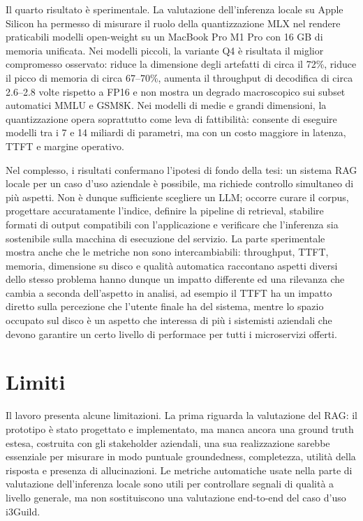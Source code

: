 Il quarto risultato è sperimentale. La valutazione dell'inferenza locale su
Apple Silicon ha permesso di misurare il ruolo della quantizzazione MLX nel
rendere praticabili modelli open-weight su un MacBook Pro M1 Pro con 16 GB di
memoria unificata. Nei modelli piccoli, la variante Q4 è risultata il miglior
compromesso osservato: riduce la dimensione degli artefatti di circa il 72\%,
riduce il picco di memoria di circa 67--70\%, aumenta il throughput di
decodifica di circa 2.6--2.8 volte rispetto a FP16 e non mostra un degrado
macroscopico sui subset automatici MMLU e GSM8K. Nei modelli di medie e grandi dimensioni, la
quantizzazione opera soprattutto come leva di fattibilità: consente di
eseguire modelli tra i 7 e 14 miliardi di parametri, ma con un costo maggiore in latenza,
TTFT e margine operativo.

Nel complesso, i risultati confermano l'ipotesi di fondo della tesi: un sistema
RAG locale per un caso d'uso aziendale è possibile, ma richiede controllo
simultaneo di più aspetti. Non è dunque sufficiente scegliere un LLM; occorre
curare il corpus, progettare accuratamente l'indice, definire la pipeline di retrieval,
stabilire formati di output compatibili con l'applicazione e verificare che
l'inferenza sia sostenibile sulla macchina di esecuzione del servizio. La parte sperimentale mostra
anche che le metriche non sono intercambiabili: throughput, TTFT, memoria,
dimensione su disco e qualità automatica raccontano aspetti diversi dello
stesso problema hanno dunque un impatto differente ed una rilevanza che cambia a seconda dell'aspetto in analisi,
ad esempio il TTFT ha un impatto diretto sulla percezione che l'utente finale ha del sistema, mentre lo spazio occupato
sul disco è un aspetto che interessa di più i sistemisti aziendali che devono garantire un certo livello di performace per tutti 
i microservizi offerti.

\section*{Limiti}

Il lavoro presenta alcune limitazioni. La prima riguarda la valutazione
del RAG: il prototipo è stato progettato e implementato, ma manca ancora una
ground truth estesa, costruita con gli stakeholder aziendali, una sua realizzazione 
sarebbe essenziale per misurare in modo puntuale groundedness, completezza, utilità della risposta e presenza di
allucinazioni. Le metriche automatiche usate nella
parte di valutazione dell'inferenza locale sono utili per controllare segnali di qualità a livello generale, ma non
sostituiscono una valutazione end-to-end del caso d'uso i3Guild.

